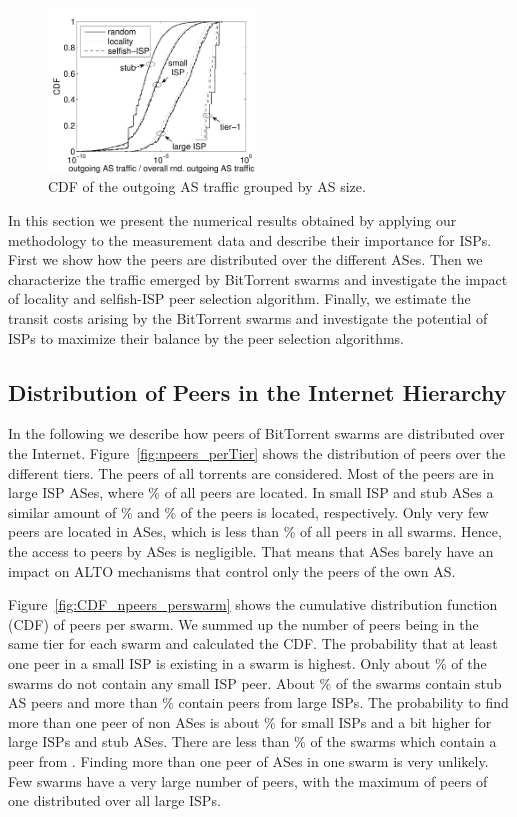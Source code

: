 \begin{figure}
	\centering
	\includegraphics[width=0.49\textwidth]{aslevel/p2p/results/figs/outgoing_CDF}
 	\caption{CDF of the outgoing AS traffic grouped by AS size.}
 	\label{fig:outgoing_CDF}
\end{figure}

In this section we present the numerical results obtained by applying our methodology to the measurement data and describe their importance for ISPs. First we show how the peers are distributed over the different ASes. Then we characterize the traffic emerged by BitTorrent swarms and investigate the impact of locality and selfish-ISP peer selection algorithm. Finally, we estimate the transit costs arising by the BitTorrent swarms and investigate the potential of ISPs to maximize their balance by the peer selection algorithms.

\subsection{Distribution of Peers in the Internet Hierarchy}
In the following we describe how peers of BitTorrent swarms are distributed over the Internet.
Figure~\ref{fig:npeers_perTier} shows the distribution of peers over the different tiers. The peers of all torrents are considered. Most of the peers are in large ISP ASes, where \unit[40]{\%} of all peers are located. In small ISP and stub ASes a similar amount of \unit[29]{\%} and \unit[31]{\%} of the peers is located, respectively. Only very few peers are located in \tier ASes, which is less than \unit[1]{\%} of all peers in all swarms. Hence, the access to peers by \tier ASes is negligible. That means that \tier ASes barely have an impact on ALTO mechanisms that control only the peers of the own AS.

Figure~\ref{fig:CDF_npeers_perswarm} shows the cumulative distribution function (CDF) of peers per swarm. We summed up the number of peers being in the same tier for each swarm and calculated the CDF. The probability that at least one peer in a small ISP is existing in a swarm is highest. Only about \unit[2]{\%} of the swarms do not contain any small ISP peer. About \unit[57]{\%} of the swarms contain stub AS peers and more than \unit[60]{\%} contain peers from large ISPs. The probability to find more than one peer of non \tier ASes is about \unit[45]{\%} for small ISPs and a bit higher for large ISPs and stub ASes. There are less than \unit[10]{\%} of the swarms which contain a peer from \tier. Finding more than one peer of \tier ASes in one swarm is very unlikely. Few swarms have a very large number of peers, with the maximum of  peers of one distributed over all large ISPs.

